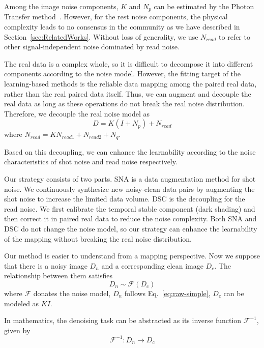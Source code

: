 \documentclass[sigconf,screen,nonacm]{acmart}
\begin{document}
Among the image noise components, $K$ and $N_p$ can be estimated by the Photon Transfer method~\cite{SPIE85/CCD, EMVA1288}. However, for the rest noise components, the physical complexity leads to no consensus in the community as we have described in Section~\ref{sec:RelatedWorks}. Without loss of generality, we use $N_{read}$ to refer to other signal-independent noise dominated by read noise. 

The real data is a complex whole, so it is difficult to decompose it into different components according to the noise model. However, the fitting target of the learning-based methods is the reliable data mapping among the paired real data, rather than the real paired data itself. Thus, we can augment and decouple the real data as long as these operations do not break the real noise distribution.
Therefore, we decouple the real noise model as
\begin{equation}\label{eq:raw-simple}
    D = K (I + N_{p}) + N_{read}
\end{equation}
where $N_{read} = KN_{read1} + N_{read2} + N_q$.

Based on this decoupling, we can enhance the learnability according to the noise characteristics of shot noise and read noise respectively.

Our strategy consists of two parts.
SNA is a data augmentation method for shot noise. We continuously synthesize new noisy-clean data pairs by augmenting the shot noise to increase the limited data volume.
DSC is the decoupling for the read noise. We first calibrate the temporal stable component (dark shading) and then correct it in paired real data to reduce the noise complexity.
Both SNA and DSC do not change the noise model, so our strategy can enhance the learnability of the mapping without breaking the real noise distribution.

Our method is easier to understand from a mapping perspective.
Now we suppose that there is a noisy image $D_{n}$ and a corresponding clean image $D_{c}$. 
The relationship between them satisfies
\begin{equation}\label{eq:Dnoisy}
    D_{n} \sim \mathcal F(D_{c})
\end{equation}
where $\mathcal F$ donates the noise model, $D_{n}$ follows Eq.~\eqref{eq:raw-simple}, $D_{c}$ can be modeled as $KI$.

In mathematics, the denoising task can be abstracted as its inverse function $\mathcal F^{-1}$, given by
\begin{equation}\label{eq:NRMapping}
    \mathcal F^{-1}:  D_{n} \rightarrow D_{c}
\end{equation}
\end{document}
